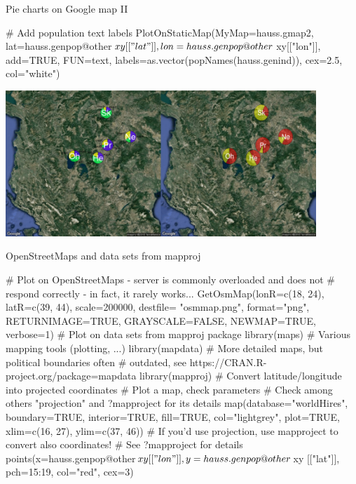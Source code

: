 \documentclass[compress, ucs, xelatex, 11pt, xcolor=svgnames,
	hyperref={
		bookmarks=true,
		unicode=true,
		colorlinks=true,
		pdftitle={Molecular data in R},
		plainpages=false,
		pdfauthor={Vojtech Zeisek},
		pdfsubject={Course about phylogeny and evolution in R},
		pdfcreator={XeLaTeX},
		pdfkeywords={R, evolution, phylogeny, molecular data},
		linkcolor=Tomato,
		anchorcolor=SaddleBrown,
		citecolor=Goldenrod,
		filecolor=DarkMagenta,
		menucolor=Sienna,
		urlcolor=DarkTurquoise,
		pdftex},
	url={hyphens, lowtilde} %
	]{beamer}
\begin{document}
\begin{frame}[fragile]{Pie charts on Google map II}
	\begin{spluscode}
    # Add population text labels
    PlotOnStaticMap(MyMap=hauss.gmap2, lat=hauss.genpop@other$xy[["lat"]],
      lon=hauss.genpop@other$xy[["lon"]], add=TRUE, FUN=text,
      labels=as.vector(popNames(hauss.genind)), cex=2.5, col="white")
	\end{spluscode}
	\begin{center}
		\includegraphics[height=5.5cm]{map_pie_google.png}
	\end{center}
\end{frame}

\begin{frame}[fragile]{OpenStreetMaps and data sets from mapproj}
	\begin{spluscode}
    # Plot on OpenStreetMaps - server is commonly overloaded and does not
    # respond correctly - in fact, it rarely works...
    GetOsmMap(lonR=c(18, 24), latR=c(39, 44), scale=200000, destfile=
      "osmmap.png", format="png", RETURNIMAGE=TRUE, GRAYSCALE=FALSE,
      NEWMAP=TRUE, verbose=1)
    # Plot on data sets from mapproj package
    library(maps) # Various mapping tools (plotting, ...)
    library(mapdata) # More detailed maps, but political boundaries often
           # outdated, see https://CRAN.R-project.org/package=mapdata
    library(mapproj) # Convert latitude/longitude into projected coordinates
    # Plot a map, check parameters
    # Check among others "projection" and ?mapproject for its details
    map(database="worldHires", boundary=TRUE, interior=TRUE, fill=TRUE,
      col="lightgrey", plot=TRUE, xlim=c(16, 27), ylim=c(37, 46))
    # If you'd use projection, use mapproject to convert also coordinates!
    # See ?mapproject for details
    points(x=hauss.genpop@other$xy[["lon"]], y=hauss.genpop@other$xy
      [["lat"]], pch=15:19, col="red", cex=3)
	\end{spluscode}
\end{frame}
\end{document}
